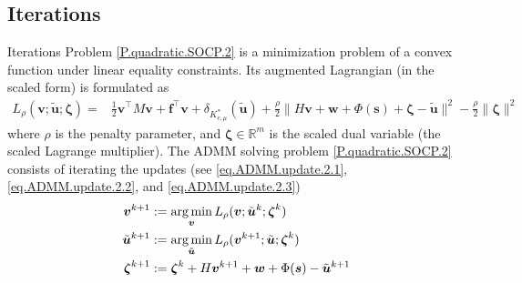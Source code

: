 \documentclass[8pt,red]{beamer}
\theoremstyle{plain}
\theoremstyle{definition}
\theoremstyle{remark}
\newcommand{\argmin}{\operatornamewithlimits{\mathrm{arg\,min}}}
\renewcommand{\Re}{\ensuremath{\mathbb{R}}}
\newcommand{\bi}[1]{\ensuremath{\boldsymbol{#1}}}
\begin{document}
\subsection{Iterations}
\begin{frame}{Iterations}
Problem \eqref{P.quadratic.SOCP.2} is a minimization problem of a convex 
function under linear equality constraints. 
Its augmented Lagrangian (in the scaled form) is formulated as 
\begin{align}
  L_{\rho}(\bi{v};\tilde{\bi{u}};\bi{\zeta}) 
  =& \frac{1}{2} \bi{v}^{\top} M \bi{v} + \bi{f}^{\top} \bi{v} 
  +  \delta_{K_{e,\mu}^{*}}(\tilde{\bi{u}}) +  \frac{\rho}{2} 
  \| H \bi{v} + \bi{w} + \Phi(\bi{s}) + \bi{\zeta}  - \tilde{\bi{u}} \|^{2}
    - \frac{\rho}{2} \| \bi{\zeta}\|^{2} 
    \label{eq.ADMM.friction.AugLagrange}
\end{align}
where $\rho$ is the penalty parameter, and $\bi{\zeta} \in \Re^{m}$ is  the scaled dual variable (the scaled Lagrange multiplier). 
The ADMM solving problem \eqref{P.quadratic.SOCP.2} consists of 
iterating the updates (see \eqref{eq.ADMM.update.2.1}, 
\eqref{eq.ADMM.update.2.2}, and \eqref{eq.ADMM.update.2.3}) 
\begin{align}
  \bi{v}^{k+1} 
  &:= \argmin_{\bi{v}} 
  L_{\rho}(\bi{v};\tilde{\bi{u}}^{k};\bi{\zeta}^{k})  
  \label{eq.ADMM.friction.1.1} \\
  \tilde{\bi {u}}^{k+1}
  &:= \argmin_{\tilde{\bi{u}}} 
    L_{\rho}(\bi{v}^{k+1};\tilde{\bi{u}};\bi{\zeta}^{k}) 
    \label{eq.ADMM.friction.1.2} \\
  \bi{\zeta}^{k+1} &:= \bi{\zeta}^{k} 
  + 
  H \bi{v}^{k+1} +\bi{w} +\Phi(\bi{s}) - \tilde{\bi{u}}^{k+1}  
  \label{eq.ADMM.friction.1.3}
\end{align}
\end{frame}
\end{document}
